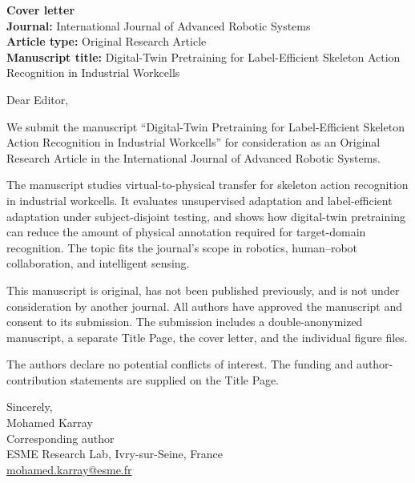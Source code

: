 \documentclass[12pt]{article}
\begin{document}
\noindent\textbf{Cover letter}\\[1em]
\textbf{Journal:} International Journal of Advanced Robotic Systems\\
\textbf{Article type:} Original Research Article\\
\textbf{Manuscript title:} Digital-Twin Pretraining for Label-Efficient Skeleton
Action Recognition in Industrial Workcells

\vspace{1em}

Dear Editor,

\vspace{0.5em}

We submit the manuscript ``Digital-Twin Pretraining for Label-Efficient
Skeleton Action Recognition in Industrial Workcells'' for consideration as an
Original Research Article in the International Journal of Advanced Robotic
Systems.

The manuscript studies virtual-to-physical transfer for skeleton action
recognition in industrial workcells. It evaluates unsupervised adaptation and
label-efficient adaptation under subject-disjoint testing, and shows how
digital-twin pretraining can reduce the amount of physical annotation required
for target-domain recognition. The topic fits the journal's scope in robotics,
human--robot collaboration, and intelligent sensing.

This manuscript is original, has not been published previously, and is not
under consideration by another journal. All authors have approved the
manuscript and consent to its submission. The submission includes a
double-anonymized manuscript, a separate Title Page, the cover letter, and the
individual figure files.

The authors declare no potential conflicts of interest. The funding and author-contribution statements are supplied on the Title
Page.

\vspace{1em}

Sincerely,\\[0.5em]
Mohamed Karray\\
Corresponding author\\
ESME Research Lab, Ivry-sur-Seine, France\\
\href{mailto:mohamed.karray@esme.fr}{mohamed.karray@esme.fr}
\end{document}
